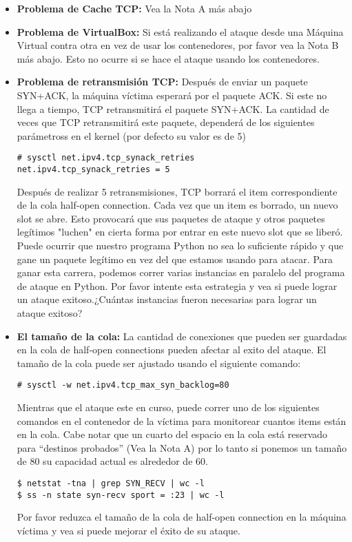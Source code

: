 \begin{itemize}
  \item \textbf{Problema de Cache TCP:} Vea la Nota A más abajo

  \item \textbf{Problema de VirtualBox:} Si está realizando el ataque desde una Máquina Virtual contra otra en vez de usar los contenedores, por favor vea la Nota B más abajo. Esto no ocurre si se hace el ataque usando los contenedores.

  \item \textbf{Problema de retransmisión TCP:} 
  Después de enviar un paquete SYN+ACK, la máquina víctima esperará por el paquete ACK. Si este no llega a tiempo, TCP retransmitirá el paquete SYN+ACK. 
  La cantidad de veces que TCP retransmitirá este paquete, dependerá de los siguientes parámetross en el kernel (por defecto su valor es de 5)
    
\begin{lstlisting}
# sysctl net.ipv4.tcp_synack_retries
net.ipv4.tcp_synack_retries = 5
\end{lstlisting}
	
	Después de realizar 5 retransmisiones, TCP borrará el item correspondiente de la cola half-open connection. Cada vez que un item es borrado, un nuevo slot se abre. Esto provocará que sus paquetes de ataque y otros paquetes legítimos "luchen" en cierta forma por entrar en este nuevo slot que se liberó. Puede ocurrir que nuestro programa Python no sea lo suficiente rápido y que gane un paquete legítimo en vez del que estamos usando para atacar. Para ganar esta carrera, podemos correr varias instancias en paralelo del programa de ataque en Python. Por favor intente esta estrategia y vea si puede lograr un ataque exitoso.¿Cuántas instancias fueron necesarias para lograr un ataque exitoso?
 

  \item \textbf{El tamaño de la cola:}  
  	La cantidad de conexiones que pueden ser guardadas en la cola de  half-open connections pueden afectar al exito del ataque. El tamaño de la cola puede ser ajustado usando el siguiente comando:

\begin{lstlisting}
# sysctl -w net.ipv4.tcp_max_syn_backlog=80
\end{lstlisting}
     
     Mientras que el ataque este en curso, puede correr uno de los siguientes comandos en el contenedor de la víctima para monitorear cuantos items están en la cola. Cabe notar que un cuarto del espacio en la cola está reservado para ``destinos probados'' (Vea la Nota A) por lo tanto si ponemos un tamaño de 80 su capacidad actual es alrededor de 60.
     
\begin{lstlisting}
$ netstat -tna | grep SYN_RECV | wc -l
$ ss -n state syn-recv sport = :23 | wc -l
\end{lstlisting}

	Por favor reduzca el tamaño de la cola de half-open connection en la máquina víctima y vea si puede mejorar el éxito de su ataque.
\end{itemize}

